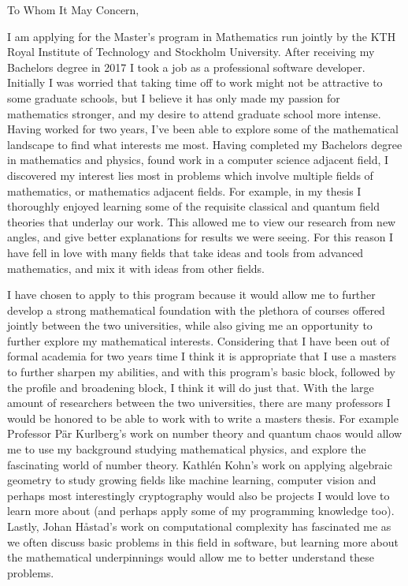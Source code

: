\documentclass[11pt]{article}
\begin{document}
\noindent
To Whom It May Concern,

I am applying for the Master's program in Mathematics run jointly by the KTH Royal Institute of Technology and Stockholm University. After receiving my Bachelors degree in 2017 I took a job as a professional software developer. Initially I was worried that taking time off to work might not be attractive to some graduate schools, but I believe it has only made my passion for mathematics stronger, and my desire to attend graduate school more intense. Having worked for two years, I've been able to explore some of the mathematical landscape to find what interests me most. Having completed my Bachelors degree in mathematics and physics, found work in a computer science adjacent field, I discovered my interest lies most in problems which involve multiple fields of mathematics, or mathematics adjacent fields. For example, in my thesis I thoroughly enjoyed learning some of the requisite classical and quantum field theories that underlay our work. This allowed me to view our research from new angles, and give better explanations for results we were seeing. For this reason I have fell in love with many fields that take ideas and tools from advanced mathematics, and mix it with ideas from other fields.

I have chosen to apply to this program because it would allow me to further develop a strong mathematical foundation with the plethora of courses offered jointly between the two universities, while also giving me an opportunity to further explore my mathematical interests. Considering that I have been out of formal academia for two years time I think it is appropriate that I use a masters to further sharpen my abilities, and with this program's basic block, followed by the profile and broadening block, I think it will do just that. With the large amount of researchers between the two universities, there are many professors I would be honored to be able to work with to write a masters thesis. For example Professor P\"{a}r Kurlberg's work on number theory and quantum chaos would allow me to use my background studying mathematical physics, and explore the fascinating world of number theory. Kathl\'{e}n Kohn's work on applying algebraic geometry to study growing fields like machine learning, computer vision and perhaps most interestingly cryptography would also be projects I would love to learn more about (and perhaps apply some of my programming knowledge too). Lastly, Johan Håstad's work on computational complexity has fascinated me as we often discuss basic problems in this field in software, but learning more about the mathematical underpinnings would allow me to better understand these problems.
\end{document}
